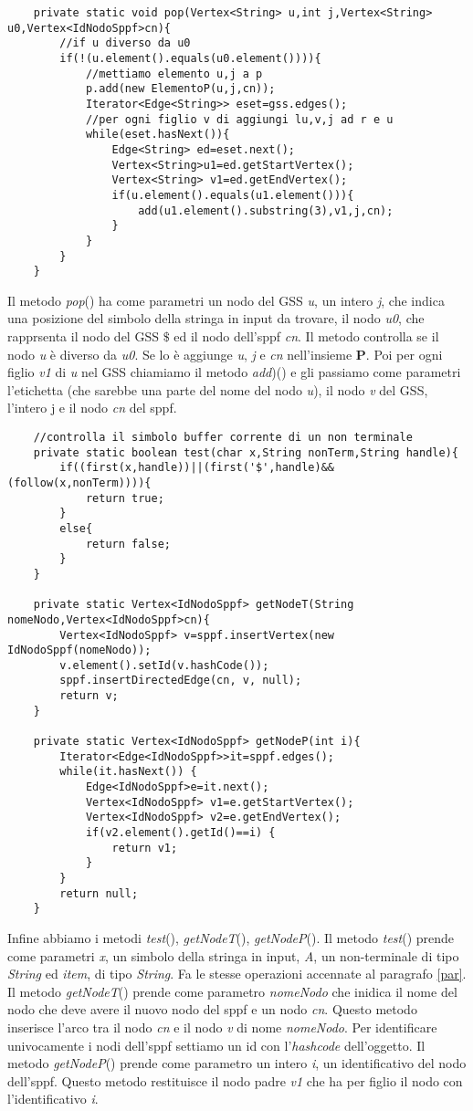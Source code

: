 \begin{lstlisting}
	private static void pop(Vertex<String> u,int j,Vertex<String> u0,Vertex<IdNodoSppf>cn){
		//if u diverso da u0
		if(!(u.element().equals(u0.element()))){
			//mettiamo elemento u,j a p
			p.add(new ElementoP(u,j,cn));
			Iterator<Edge<String>> eset=gss.edges();
			//per ogni figlio v di aggiungi lu,v,j ad r e u
			while(eset.hasNext()){
				Edge<String> ed=eset.next();
				Vertex<String>u1=ed.getStartVertex();
				Vertex<String> v1=ed.getEndVertex();
				if(u.element().equals(u1.element())){
					add(u1.element().substring(3),v1,j,cn);
				}
			}
		}
	}
\end{lstlisting}
Il metodo \textit{pop}() ha come parametri un nodo del GSS \textit{u}, un intero \textit{j}, che indica una posizione del simbolo della stringa in input da trovare, il nodo \textit{u0}, che rapprsenta il nodo del GSS $\$$ ed il nodo dell'sppf \textit{cn}. Il metodo controlla se il nodo \textit{u} è diverso da \textit{u0}. Se lo è aggiunge \textit{u}, \textit{j} e \textit{cn} nell'insieme \textbf{P}. Poi per ogni figlio \textit{v1} di \textit{u} nel GSS chiamiamo il metodo \textit{add})() e gli passiamo come parametri l'etichetta (che sarebbe una parte del nome del nodo \textit{u}), il nodo \textit{v} del GSS, l'intero j e il nodo \textit{cn}  del sppf.
\begin{lstlisting}
	//controlla il simbolo buffer corrente di un non terminale 
	private static boolean test(char x,String nonTerm,String handle){
		if((first(x,handle))||(first('$',handle)&&(follow(x,nonTerm)))){
			return true;
		}
		else{
			return false;
		}
	}
	
	private static Vertex<IdNodoSppf> getNodeT(String nomeNodo,Vertex<IdNodoSppf>cn){
		Vertex<IdNodoSppf> v=sppf.insertVertex(new IdNodoSppf(nomeNodo));
		v.element().setId(v.hashCode());
		sppf.insertDirectedEdge(cn, v, null);
		return v;
	}

	private static Vertex<IdNodoSppf> getNodeP(int i){
		Iterator<Edge<IdNodoSppf>>it=sppf.edges();
		while(it.hasNext()) {
			Edge<IdNodoSppf>e=it.next();
			Vertex<IdNodoSppf> v1=e.getStartVertex();
			Vertex<IdNodoSppf> v2=e.getEndVertex();
			if(v2.element().getId()==i) {
				return v1;
			}
		}
		return null;
	}
\end{lstlisting}
Infine abbiamo i metodi \textit{test}(), \textit{getNodeT}(), \textit{getNodeP}(). Il metodo \textit{test}() prende come parametri \textit{x}, un simbolo della stringa in input, \textit{A}, un non-terminale di tipo \textit{String} ed \textit{item}, di tipo \textit{String}. Fa le stesse operazioni accennate al paragrafo \ref{par}. Il metodo \textit{getNodeT}() prende come parametro \textit{nomeNodo} che inidica il nome del nodo che deve avere il nuovo nodo del sppf e un nodo \textit{cn}. Questo metodo inserisce l'arco tra il nodo \textit{cn} e il nodo \textit{v} di nome \textit{nomeNodo}. Per identificare univocamente i nodi dell'sppf settiamo un id con l'\textit{hashcode} dell'oggetto. Il metodo \textit{getNodeP}() prende come parametro un intero \textit{i}, un identificativo del nodo dell'sppf. Questo metodo restituisce il nodo padre \textit{v1} che ha per figlio il nodo con l'identificativo \textit{i}.\\
